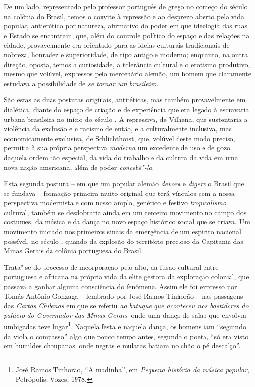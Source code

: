 De um lado, representado pelo professor português de grego no começo do
século  na colônia do Brasil, temos o convite à repressão e ao
desprezo aberto pela vida popular, antierótico por natureza, afirmativo
do poder em que ideologia das ruas e Estado se encontram, que, além do
controle político do espaço e das relações na cidade, provavelmente era
orientado para as ideias culturais tradicionais de nobreza, honradez e
superioridade, de tipo antigo e moderno; enquanto, na outra direção,
oposta, temos a curiosidade, a tolerância cultural e o erotismo
produtivo, mesmo que volúvel, expressos pelo mercenário alemão, um homem
que claramente estudava a possibilidade de \emph{se tornar um
brasileiro}.

São estas as duas posturas originais, antitéticas, mas também
provavelmente em dialética, diante do espaço de criação e de experiência
que era legado à escravaria urbana brasileira no início do século . A
repressiva, de Vilhena, que sustentaria a violência da exclusão e o
racismo de então, e a culturalmente inclusiva, mas economicamente
exclusiva, de Schlichthorst, que, volúvel deste modo preciso, permitia à
sua própria perspectiva \emph{moderna} um excedente de uso e de gozo
daquela ordem tão especial, da vida do trabalho e da cultura da vida em
uma nova nação americana, além de poder \emph{concebê"-la}.

Esta segunda postura -- em que um popular alemão \emph{devora} e
\emph{digere} o Brasil que se fundava -- formação primeira muito
original que terá vínculos com a nossa perspectiva modernista e com
nosso amplo, genérico e festivo \emph{tropicalismo} cultural, também se
desdobraria ainda em um terceiro movimento no campo dos costumes, da
música e da dança no novo espaço histórico social que se criava. Um
movimento iniciado nos primeiros sinais da emergência de um espirito
nacional possível, no século , quando da explosão do território
precioso da Capitania das Minas Gerais da colônia portuguesa do Brasil.

Trata"-se do processo de incorporação pelo alto, da fusão cultural entre
portuguesa e africana na própria vida da elite gestora da exploração
colonial, que passava a ganhar alguma consciência do fenômeno. Assim ele
foi expresso por Tomás Antônio Gonzaga -- lembrado por José Ramos
Tinhorão -- nas passagens das \emph{Cartas} \emph{Chilenas} em que se
referiu \emph{ao batuque que aconteceu nos bastidores do palácio do
Governador das Minas Gerais}, onde uma dança de salão que envolvia
umbigadas teve lugar\footnote{José Ramos Tinhorão, ``A modinha'', em
  \emph{Pequena história da música popular}, Petrópolis: Vozes, 1978.}.
Naquela festa e naquela dança, os homens iam ``seguindo da viola o
compasso'' algo que pouco tempo antes, segundo o poeta, ``só era visto
em humildes choupanas, onde negras e mulatas batiam no chão o pé
descalço''.

